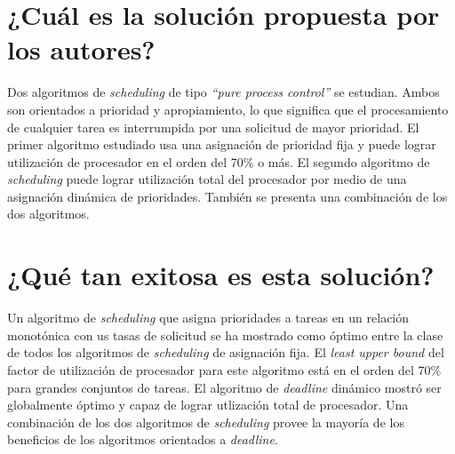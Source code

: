      
\section{¿Cuál es la solución propuesta por los autores?}
Dos algoritmos de \emph{scheduling} de tipo \emph{``pure process control''} se estudian. Ambos son orientados a prioridad y apropiamiento, lo que significa que el procesamiento de cualquier tarea es interrumpida por una solicitud de mayor prioridad. El primer algoritmo estudiado usa una asignación de prioridad fija y puede lograr utilización de procesador en el orden del 70\% o más. El segundo algoritmo de \emph{scheduling} puede lograr utilización total del procesador por medio de una asignación dinámica de prioridades. También se presenta una combinación de los dos algoritmos.

\section{¿Qué tan exitosa es esta solución?}
Un algoritmo de \emph{scheduling} que asigna prioridades a tareas en un relación monotónica con us tasas de solicitud se ha mostrado como óptimo entre la clase de todos los algoritmos de \emph{scheduling} de asignación fija. El \emph{least upper bound} del factor de utilización de procesador para este algoritmo está en el orden del 70\% para grandes conjuntos de tareas. El algoritmo de \emph{deadline} dinámico mostró ser globalmente óptimo y capaz de lograr utlización total de procesador. Una combinación de los dos algoritmos de \emph{scheduling} provee la mayoría de los beneficios de los algoritmos orientados a \emph{deadline}.   
